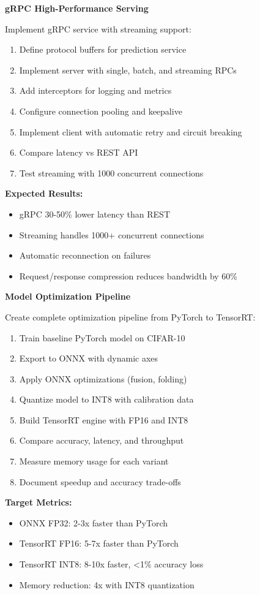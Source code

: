 \begin{exercise}
\textbf{gRPC High-Performance Serving}

Implement gRPC service with streaming support:

\begin{enumerate}
    \item Define protocol buffers for prediction service
    \item Implement server with single, batch, and streaming RPCs
    \item Add interceptors for logging and metrics
    \item Configure connection pooling and keepalive
    \item Implement client with automatic retry and circuit breaking
    \item Compare latency vs REST API
    \item Test streaming with 1000 concurrent connections
\end{enumerate}

\textbf{Expected Results:}
\begin{itemize}
    \item gRPC 30-50\% lower latency than REST
    \item Streaming handles 1000+ concurrent connections
    \item Automatic reconnection on failures
    \item Request/response compression reduces bandwidth by 60\%
\end{itemize}
\end{exercise}

\begin{exercise}
\textbf{Model Optimization Pipeline}

Create complete optimization pipeline from PyTorch to TensorRT:

\begin{enumerate}
    \item Train baseline PyTorch model on CIFAR-10
    \item Export to ONNX with dynamic axes
    \item Apply ONNX optimizations (fusion, folding)
    \item Quantize model to INT8 with calibration data
    \item Build TensorRT engine with FP16 and INT8
    \item Compare accuracy, latency, and throughput
    \item Measure memory usage for each variant
    \item Document speedup and accuracy trade-offs
\end{enumerate}

\textbf{Target Metrics:}
\begin{itemize}
    \item ONNX FP32: 2-3x faster than PyTorch
    \item TensorRT FP16: 5-7x faster than PyTorch
    \item TensorRT INT8: 8-10x faster, <1\% accuracy loss
    \item Memory reduction: 4x with INT8 quantization
\end{itemize}
\end{exercise}

